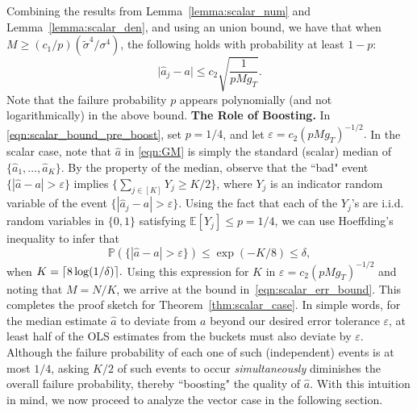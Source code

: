 \documentclass[letterpaper, 11 pt]{article}
\newcommand{\abs}[1]{\lvert #1 \rvert}
\DeclarePairedDelimiter\ceil{\lceil}{\rceil}
\begin{document}
Combining the results from Lemma~\ref{lemma:scalar_num} and Lemma~\ref{lemma:scalar_den}, and using an union bound, we have that when $M \geq (c_1/p) (\tilde{\sigma}^4/\sigma^4)$, the following holds with probability at least $1 - p$:
\begin{equation}
    \abs{\hat{a}_j - a} \leq c_2\sqrt{\frac{1}{p M g_T}}.
    \label{eqn:scalar_bound_pre_boost}
\end{equation}
Note that the failure probability $p$ appears polynomially (and not logarithmically) in the above bound. 
\newpage
\textbf{The Role of Boosting.} In \eqref{eqn:scalar_bound_pre_boost}, set $p=1/4$, and let $\varepsilon = c_2({p M g_T})^{-1/2}.$ In the scalar case, note that $\hat{a}$ in \eqref{eqn:GM} is simply the standard (scalar) median of $\{\hat{a}_1, \ldots, \hat{a}_K\}.$ By the property of the median, observe that the ``bad" event $\{ | \hat{a}-a| > \varepsilon\}$ implies $\{ \sum_{j \in [K]} Y_j \geq K/2 \}$, where $Y_j$ is an indicator random variable of the event  $\{ | \hat{a}_j-a| > \varepsilon\}$. Using the fact that each of the $Y_j$'s are i.i.d. random variables in $\{0,1\}$  satisfying $\mathbb{E}[Y_j] \leq p = 1/4$, we can use Hoeffding's inequality to infer that 
$$ \mathbb{P}\left(\{ | \hat{a}-a| > \varepsilon\}\right) \leq \exp(-K/8) \leq \delta,$$
when $K=\ceil{8 \log(1/\delta)}.$ Using this expression for $K$ in $\varepsilon= c_2({p M g_T})^{-1/2}$ and noting that $M=N/K$, we arrive at the bound in~\eqref{eqn:scalar_err_bound}. This completes the proof sketch for Theorem~\ref{thm:scalar_case}. In simple words, for the median estimate $\hat{a}$ to deviate from $a$ beyond our desired error tolerance $\varepsilon$, at least half of the OLS estimates from the buckets must also deviate by $\varepsilon$. Although the failure probability of each one of such (independent) events is at most $1/4$, asking $K/2$ of such events to occur \emph{simultaneously} diminishes the overall failure probability, thereby ``boosting" the quality of $\hat{a}$. With this intuition in mind, we now proceed to analyze the vector case in the following section. 
\end{document}
